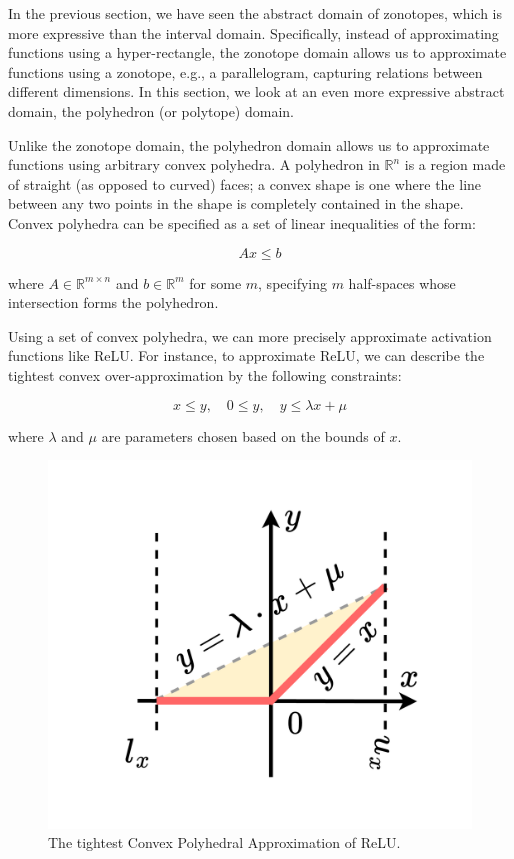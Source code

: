 \documentclass[oneside,11pt,dvipsnames]{book}
\begin{document}
In the previous section, we have seen the abstract domain of zonotopes, which is more expressive than the interval domain. Specifically, instead of approximating functions using a hyper-rectangle, the zonotope domain allows us to approximate functions using a zonotope, e.g., a parallelogram, capturing relations between different dimensions. In this section, we look at an even more expressive abstract domain, the polyhedron (or polytope) domain. 

Unlike the zonotope domain, the polyhedron domain allows us to approximate functions using arbitrary convex polyhedra. A polyhedron in \(\mathbb{R}^n\) is a region made of straight (as opposed to curved) faces; a convex shape is one where the line between any two points in the shape is completely contained in the shape. Convex polyhedra can be specified as a set of linear inequalities of the form:

\[
Ax \leq b
\]

where \(A \in \mathbb{R}^{m \times n}\) and \(b \in \mathbb{R}^m\) for some \(m\), specifying \(m\) half-spaces whose intersection forms the polyhedron.

Using a set of convex polyhedra, we can more precisely approximate activation functions like ReLU. For instance, to approximate ReLU, we can describe the tightest convex over-approximation by the following constraints:

\[
x \leq y, \quad 0 \leq y, \quad y \leq \lambda x + \mu
\]

where \(\lambda\) and \(\mu\) are parameters chosen based on the bounds of \(x\).

\begin{figure}[h]
    \centering
    \includegraphics[width=0.5\linewidth]{figure/3-lines-polytope.png}
    \caption{The tightest Convex Polyhedral Approximation of ReLU.}
    \label{fig:enter-label}
\end{figure}
\end{document}
